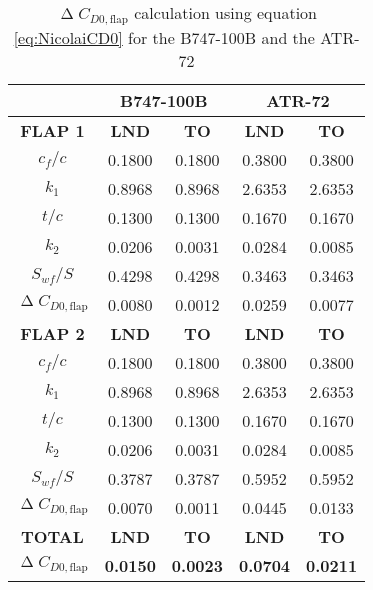 %
\vspace*{1.5cm}
%
\begin{table}[H]
  \centering
    \begin{tabular}{c|cc|cc}
    \toprule
    \multicolumn{1}{c}{\textbf{}} & \multicolumn{2}{c}{\textbf{B747-100B}} & \multicolumn{2}{c}{\textbf{ATR-72}} \\
    \midrule
    \multicolumn{1}{c}{\textbf{FLAP 1}} & \multicolumn{1}{c}{\textbf{LND}} & \multicolumn{1}{c}{\textbf{TO}} & \multicolumn{1}{c}{\textbf{LND}} & \multicolumn{1}{c}{\textbf{TO}} \\
    \midrule
    $c_f/c$  & 0.1800 & 0.1800 & 0.3800 & 0.3800 \\
    $k_1$    & 0.8968 & 0.8968 & 2.6353 & 2.6353 \\
    $t/c$   & 0.1300 & 0.1300 & 0.1670 & 0.1670 \\
    $k_2$    & 0.0206 & 0.0031 & 0.0284 & 0.0085 \\
    $S_{wf}/S$ & 0.4298 & 0.4298 & 0.3463 & 0.3463 \\
    $\upDelta C_{D0,\text{flap}}$ & 0.0080 & 0.0012 & 0.0259 & 0.0077 \\
    \midrule
    \multicolumn{1}{c}{\textbf{FLAP 2}} & \multicolumn{1}{c}{\textbf{LND}} & \multicolumn{1}{c}{\textbf{TO}} & \multicolumn{1}{c}{\textbf{LND}} & \multicolumn{1}{c}{\textbf{TO}} \\
    \midrule
    $c_f/c$  & 0.1800 & 0.1800 & 0.3800 & 0.3800 \\
    $k_1$    & 0.8968 & 0.8968 & 2.6353 & 2.6353 \\
    $t/c$   & 0.1300 & 0.1300 & 0.1670 & 0.1670 \\
    $k_2$    & 0.0206 & 0.0031 & 0.0284 & 0.0085 \\
    $S_{wf}/S$ & 0.3787 & 0.3787 & 0.5952 & 0.5952 \\
    $\upDelta C_{D0,\text{flap}}$ & 0.0070 & 0.0011 & 0.0445 & 0.0133 \\
    \midrule
    \midrule
    \multicolumn{1}{c}{\textbf{TOTAL}} & \multicolumn{1}{c}{\textbf{LND}} & \multicolumn{1}{c}{\textbf{TO}} & \multicolumn{1}{c}{\textbf{LND}} & \multicolumn{1}{c}{\textbf{TO}} \\
    \midrule
    \textbf{$\upDelta C_{D0,\text{flap}}$} & \textbf{0.0150} & \textbf{0.0023} & \textbf{0.0704} & \textbf{0.0211} \\
    \bottomrule
    \end{tabular}
    \caption{$\upDelta C_{D0,\text{flap}}$ calculation using equation \ref{eq:NicolaiCD0} for the B747-100B and the ATR-72}
  \label{tab:NicolaiDeltaCD0}
\end{table}
